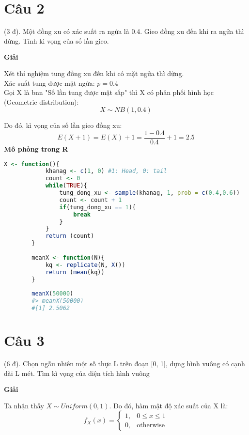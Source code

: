 \documentclass[a4paper,12pt]{article}
\begin{document}
	\section{Câu 2}
	(3 đ). Một đồng xu có xác suất ra ngửa là 0.4. Gieo đồng xu đến khi ra ngửa thì dừng. Tính
	kì vọng của số lần gieo. \\
	
	\begin{center}
		\textbf{Giải}
	\end{center}
	
	Xét thí nghiệm tung đồng xu đến khi có mặt ngửa thì dừng.\\
	
	Xác suất tung được mặt ngửa: $p = 0.4$\\
	
	Gọi X là bnn "Số lần tung được mặt sấp" thì X có phân phối hình học (Geometric distribution):
	$$X \sim NB(1, 0.4)$$
	
	Do đó, kì vọng của số lần gieo đồng xu:
	$$E(X + 1) = E(X) + 1 = \frac{1 - 0.4}{0.4} + 1 = 2.5$$
	{\large\textbf{Mô phỏng trong R}} \\
	\begin{lstlisting}[language=R]
		X <- function(){
			khanag <- c(1, 0) #1: Head, 0: tail
			count <- 0
			while(TRUE){
				tung_dong_xu <- sample(khanag, 1, prob = c(0.4,0.6))
				count <- count + 1
				if(tung_dong_xu == 1){
					break
				}
			}
			return (count)
		}
		
		meanX <- function(N){
			kq <- replicate(N, X())
			return (mean(kq))
		}
		
		meanX(50000)
		#> meanX(50000)
		#[1] 2.5062
	\end{lstlisting}
	
	\section{Câu 3}
	(6 đ). Chọn ngẫu nhiên một số thực L trên đoạn [0, 1], dựng hình vuông có cạnh dài L mét. Tìm kì vọng của diện tích hình vuông \\
	
	\begin{center}
		\textbf{Giải}
	\end{center}
		
	Ta nhận thấy $X \sim Uniform(0, 1)$. Do đó, hàm mật độ xác suất của X là:
	\begin{equation*}
	f_X(x) = 
	\begin{cases}
	1, & \text{$0 \leq x \leq 1$} \\
	0, & \text{otherwise}
	\end{cases}
	\end{equation*}
	
\end{document}
